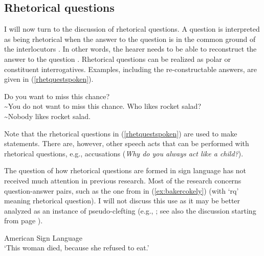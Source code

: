 \subsection{Rhetorical questions}\label{rhetq}
I will now turn to the discussion of rhetorical questions. A question is interpreted as being rhetorical when the answer to the question is in the common ground of the interlocutors \citep{caponigro2007rhetorical}. In other words, the hearer needs to be able to reconstruct the answer to the question \citep{truckenbrodt2004strukturbedeutung}. Rhetorical questions can be realized as polar or constituent interrogatives. Examples, including the re-constructable answers, are given in (\ref{rhetquestspoken}). 

\begin{exe}
\ex\label{rhetquestspoken}\begin{xlist}
\ex Do you want to miss this chance? \\
\textasciitilde You do not want to miss this chance. \label{polarrhet}
\ex Who likes rocket salad? \\
\textasciitilde Nobody likes rocket salad. \label{constituentrhet}
\end{xlist}
\end{exe} 

\noindent Note that the rhetorical questions in (\ref{rhetquestspoken}) are used to make statements. There are, however, other speech acts that can be performed with rhetorical questions, e.g.,  accusations (\textit{Why do you always act like a child?}). 

The question of how rhetorical questions are formed in sign language has not received much attention in previous research. Most of the research concerns question-answer pairs, such as the one from \citet[138]{baker1980american} in (\ref{ex:bakercokely}) (with `rq' meaning rhetorical question). I will not discuss this use as it may be better analyzed as an instance of pseudo-clefting (e.g., \citealt{wilbur1996evidence}; see also the discussion starting from page \pageref{pseudocleeeeefts}).%

\begin{exe}
\ex American Sign Language\\   
\glt `This woman died, because she refused to eat.' \label{ex:bakercokely} 
\end{exe}

